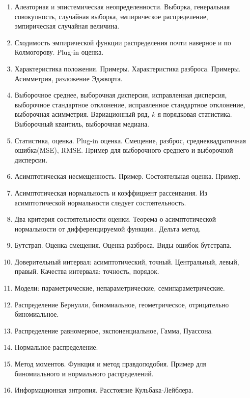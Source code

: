 
\begin{enumerate}
	\item Алеаторная и эпистемическая неопределенности. Выборка, генеральная совокупность, случайная выборка, эмпирическое распределение, эмпирическая случайная величина.
	\item Сходимость эмпирической функции распределения почти наверное и по Колмогорову. Plug-in оценка.
	\item Характеристика положения. Примеры. Характеристика разброса. Примеры. Асимметрия, разложение Эджворта.
	\item Выборочное среднее, выборочная дисперсия, исправленная дисперсия, выборочное стандартное отклонение, исправленное стандартное отклонение, выборочная асимметрия. Вариационный ряд, $k$-я порядковая статистика. Выборочный квантиль, выборочная медиана.
	\item Статистика, оценка. Plug-in оценка. Смещение, разброс, среднеквадратичная ошибка(MSE), RMSE. Пример для выборочного среднего и выборочной дисперсии.
	\item Асимптотическая несмещенность. Пример. Состоятельная оценка. Пример. 
	\item Асимптотическая нормальность и коэффициент рассеивания. Из асимптотической нормальности следует состоятельность.
	\item Два критерия состоятельности оценки. Теорема о асимптотической нормальности от дифференцируемой функции.. Дельта метод.
	\item Бутстрап. Оценка смещения. Оценка разброса. Виды ошибок бутстрапа.
	\item Доверительный интервал: асимптотический, точный. Центральный, левый, правый. Качества интервала: точность, порядок.
	\item Модели: параметрические, непараметрические, семипараметрические. 
	\item Распределение Бернулли, биномиальное, геометрическое, отрицательно биномиальное.
	\item Распределение равномерное, экспоненциальное, Гамма, Пуассона.
	\item Нормальное распределение.
	\item Метод моментов. Функция и метод правдоподобия. Пример для биномиального и нормального распределений.
	\item Информационная энтропия. Расстояние Кульбака-Лейблера.
	
\end{enumerate}
